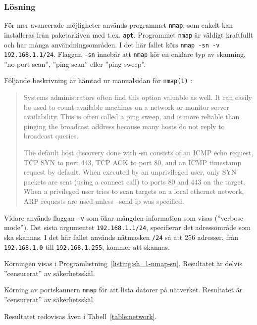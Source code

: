 \subsubsection{Lösning}
För mer avancerade möjligheter används programmet \texttt{nmap}, som enkelt kan
installeras från paketarkiven med t.ex. \texttt{apt}.  Programmet \texttt{nmap}
är väldigt kraftfullt och har många användningsområden.  I det här fallet körs
\texttt{nmap -sn -v 192.168.1.1/24}.  Flaggan \texttt{-sn} innebär att
\texttt{nmap} kör en enklare typ av skanning, ''no port scan'', ''ping scan''
eller ''ping sweep''.

Följande beskrivning är hämtad ur manualsidan för \texttt{nmap(1)}
\cite{manpage:nmap}:

\begin{quotation}
Systems administrators often find this option valuable as well. It can easily
be used to count available machines on a network or monitor server
availability. This is often called a ping sweep, and is more reliable than
pinging the broadcast address because many hosts do not reply to broadcast
queries.

The default host discovery done with -sn consists of an ICMP echo request, TCP
SYN to port 443, TCP ACK to port 80, and an ICMP timestamp request by default.
When executed by an unprivileged user, only SYN packets are sent (using a
connect call) to ports 80 and 443 on the target. When a privileged user tries
to scan targets on a local ethernet network, ARP requests are used unless
--send-ip was specified.
\end{quotation}

Vidare används flaggan \texttt{-v} som ökar mängden information som visas
(''verbose mode''). Det sista argumentet \texttt{192.168.1.1/24}, specifierar
det adressområde som ska skannas. I det här fallet används nätmasken
\texttt{/24} så att 256 adresser, från \texttt{192.168.1.0} till
\texttt{192.168.1.255}, kommer att skannas.

Körningen visas i Programlistning~\ref{listing:sh_1-nmap-sn}.
Resultatet är delvis ''censurerat'' av säkerhetsskäl.

\begin{listing}[H]
  \caption{Körning av portskannern \texttt{nmap} för att lista datorer på
           nätverket. Resultatet är ''censurerat'' av säkerhetsskäl.}
  \label{listing:sh_1-nmap-sn}
\end{listing}

Resultatet redovisas även i Tabell~\ref{table:network}.

